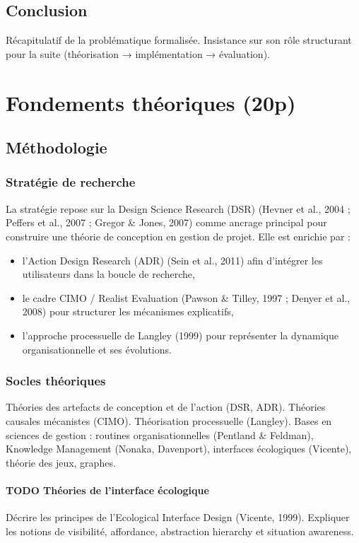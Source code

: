 \documentclass[a4paper,12pt]{article}
\begin{document}
\subsection{Conclusion}
\label{sec:org0491dde}
Récapitulatif de la problématique formalisée.
Insistance sur son rôle structurant pour la suite (théorisation → implémentation → évaluation).
\clearpage
\section{Fondements théoriques (20p)}
\label{sec:orgbfe74a4}
\subsection{Méthodologie}
\label{sec:org4f2b8e7}
\subsubsection{Stratégie de recherche}
\label{sec:org7ca159b}
La stratégie repose sur la Design Science Research (DSR) (Hevner et al., 2004 ; Peffers et al., 2007 ; Gregor \& Jones, 2007) comme ancrage principal pour construire une théorie de conception en gestion de projet.
Elle est enrichie par :
\begin{itemize}
\item l’Action Design Research (ADR) (Sein et al., 2011) afin d’intégrer les utilisateurs dans la boucle de recherche,
\item le cadre CIMO / Realist Evaluation (Pawson \& Tilley, 1997 ; Denyer et al., 2008) pour structurer les mécanismes explicatifs,
\item l’approche processuelle de Langley (1999) pour représenter la dynamique organisationnelle et ses évolutions.
\end{itemize}
\subsubsection{Socles théoriques}
\label{sec:orgffbf50e}
Théories des artefacts de conception et de l’action (DSR, ADR).
Théories causales mécanistes (CIMO).
Théorisation processuelle (Langley).
Bases en sciences de gestion : routines organisationnelles (Pentland \& Feldman), Knowledge Management (Nonaka, Davenport), interfaces écologiques (Vicente), théorie des jeux, graphes.
\paragraph*{{\bfseries\sffamily TODO} Théories de l’interface écologique}
\label{sec:orgd2f42d1}
Décrire les principes de l’Ecological Interface Design (Vicente, 1999).  
Expliquer les notions de visibilité, affordance, abstraction hierarchy et situation awareness.
\end{document}
